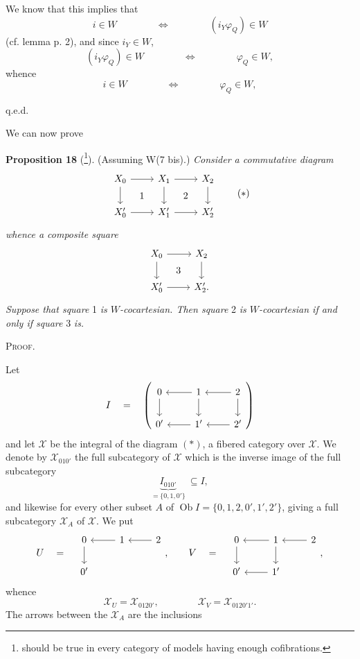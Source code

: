 \documentclass[11pt]{article}
\newcommand{\printedpage}[1]{\marginpar{\footnotesize p.~#1}}
\newcommand{\msp}[1]{\marginpar{\footnotesize [#1]}}
\newcommand{\cX}{\mathscr{X}}
\newcommand{\Ob}{\operatorname{Ob}}
\begin{document}
We know that this implies that
\[
i \in W \qquad\qquad \Longleftrightarrow \qquad\qquad (i_Y\varphi_Q) \in W
\]
(cf. lemma p. 2), and since $i_Y \in W$,
\[
(i_Y\varphi_Q) \in W \qquad\qquad \Longleftrightarrow \qquad\qquad \varphi_Q \in W,
\]
whence
\[
i \in W \qquad\qquad \Longleftrightarrow \qquad\qquad \varphi_Q \in W,
\]

\hfill q.e.d.

We can now prove

\msp{page 236}

\textbf{Proposition 18} (\footnote[127]{should be true in every category of models having enough cofibrations.}). (Assuming W(7 bis).) \textit{Consider a commutative diagram}
\[
\begin{tikzcd}[ampersand replacement=\&]
X_0 \arrow[r] \arrow[d] \arrow[rd, phantom, "1"] \& X_1 \arrow[r] \arrow[d] \arrow[rd, phantom, "2"] \& X_2 \arrow[d] \\
X'_0 \arrow[r] \& X'_1 \arrow[r] \& X'_2
\end{tikzcd}
\tag*{$(\ast)$}
\]
\textit{whence a composite square}
\[
\begin{tikzcd}[ampersand replacement=\&]
X_0 \arrow[r] \arrow[d] \arrow[rd, phantom, "3"] \& X_2 \arrow[d] \\
X'_0 \arrow[r] \& X'_2.
\end{tikzcd}
\]
\textit{Suppose that square} 1 \textit{is $W$-cocartesian. Then square} 2 \textit{is $W$-cocartesian if and only if square} 3 \textit{is.}

\textsc{Proof.}



\printedpage{152}

Let
\[
I \quad = \quad
\left(
\begin{tikzcd}[ampersand replacement=\&]
0 \arrow[d] \& 1 \arrow[l] \arrow[d] \& 2 \arrow[l] \arrow[d] \\
0' \& 1' \arrow[l] \& 2' \arrow[l]
\end{tikzcd}
\right)
\]
and let $\cX$ be the integral of the diagram $(\ast)$, a fibered category over $\cX$. We denote by $\cX_{010'}$ the full subcategory of $\cX$ which is the inverse image of the full subcategory %
\[
\underbrace{I_{010'}}_{=\{0,1,0'\}} \ \subseteq I,
\]
and likewise for every other subset $A$ of $\Ob I = \{0,1,2,0',1',2'\}$, giving a full subcategory $\cX_A$ of $\cX$. We put
\[
U \quad = \quad
\begin{tikzcd}[ampersand replacement=\&]
0 \arrow[d] \& 1 \arrow[l] \& 2 \arrow[l] \\
0' \& \&
\end{tikzcd}
, \qquad
V \quad = \quad
\begin{tikzcd}[ampersand replacement=\&]
0 \arrow[d] \& 1 \arrow[l] \arrow[d] \& 2 \arrow[l] \\
0' \& 1' \arrow[l] \&
\end{tikzcd}
,
\]
whence
\[
\cX_U = \cX_{0120'}, \qquad\qquad \cX_V = \cX_{0120'1'}.
\]
The arrows between the $\cX_A$ are the inclusions
\end{document}
